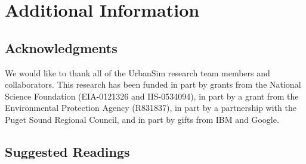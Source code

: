 
\section{Additional Information}

\subsection{Acknowledgments}

We would like to thank all of the UrbanSim research team members and
collaborators.  This research has been funded in part by grants from
the National Science Foundation (EIA-0121326 and IIS-0534094), in
part by a grant from the Environmental Protection Agency (R831837),
in part by a partnership with the Puget Sound Regional Council, and
in part by gifts from IBM and Google.

\subsection{Suggested Readings}

%

